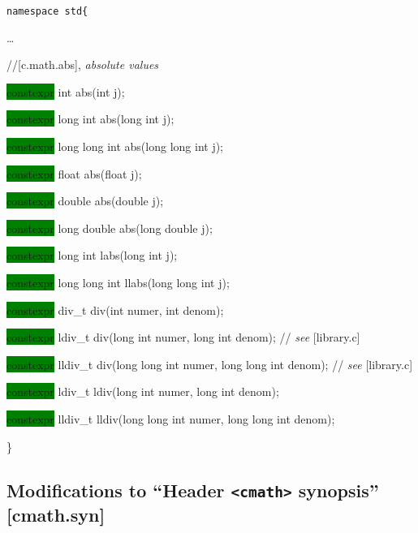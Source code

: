 \documentclass[prd,twocolumn,amsmath,amssymb,nofootinbib,eqsecnum]{revtex4-1}
\newcommand{\code}[1]{{\tt #1}}
\newcommand{\header}[1]{{\tt <#1>}}
\newcommand{\highlight}[1]{\colorbox{green}{\!\!\!\! #1}}
\newcommand{\stdcomment}[1]{{// {\it see} [#1]}}
\begin{document}
\code{namespace std\{

\vspace{2ex}

\ldots

\vspace{2ex}

//[c.math.abs], {\it absolute values}

\highlight{constexpr} int abs(int j);

\highlight{constexpr}  long int abs(long int j);

\highlight{constexpr}  long long int abs(long long int j);

\highlight{constexpr}  float abs(float j);

\highlight{constexpr} double abs(double j);

\highlight{constexpr} long double abs(long double j);

\vspace{2ex}

\highlight{constexpr} long int labs(long int j);

\highlight{constexpr}  long long int llabs(long long int j);

\vspace{2ex}

\highlight{constexpr} div\_t div(int numer, int denom);

\highlight{constexpr} ldiv\_t div(long int numer, long int denom); \stdcomment{library.c}

\highlight{constexpr} lldiv\_t div(long long int numer, long long int denom); \stdcomment{library.c}

\highlight{constexpr} ldiv\_t ldiv(long int numer, long int denom);

\highlight{constexpr} lldiv\_t lldiv(long long int numer, long long int denom);	

\}}

\subsection{Modifications to  ``Header \header{cmath} synopsis'' [cmath.syn]}
\end{document}
